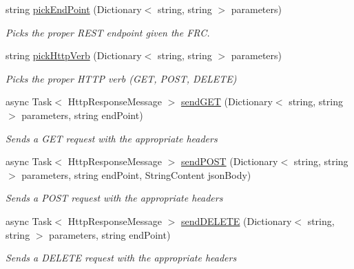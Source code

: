 \begin{DoxyCompactItemize}
string \mbox{\hyperlink{class_form_sim_1_1_rest_handler_a14a4a8f672494cea85c34f23fa508464}{pick\+End\+Point}} (Dictionary$<$ string, string $>$ parameters)
\begin{DoxyCompactList}\small\item\em Picks the proper R\+E\+ST endpoint given the F\+RC. \end{DoxyCompactList}\item 
string \mbox{\hyperlink{class_form_sim_1_1_rest_handler_a205454167e8716d9c1ed0e05d6e88564}{pick\+Http\+Verb}} (Dictionary$<$ string, string $>$ parameters)
\begin{DoxyCompactList}\small\item\em Picks the proper H\+T\+TP verb (G\+ET, P\+O\+ST, D\+E\+L\+E\+TE) \end{DoxyCompactList}\item 
async Task$<$ Http\+Response\+Message $>$ \mbox{\hyperlink{class_form_sim_1_1_rest_handler_adcca9a79f3a98112628190b11fd5c7ca}{send\+G\+ET}} (Dictionary$<$ string, string $>$ parameters, string end\+Point)
\begin{DoxyCompactList}\small\item\em Sends a G\+ET request with the appropriate headers \end{DoxyCompactList}\item 
async Task$<$ Http\+Response\+Message $>$ \mbox{\hyperlink{class_form_sim_1_1_rest_handler_ae69e912f1e70c08e4a9200efcb070bf8}{send\+P\+O\+ST}} (Dictionary$<$ string, string $>$ parameters, string end\+Point, String\+Content json\+Body)
\begin{DoxyCompactList}\small\item\em Sends a P\+O\+ST request with the appropriate headers \end{DoxyCompactList}\item 
async Task$<$ Http\+Response\+Message $>$ \mbox{\hyperlink{class_form_sim_1_1_rest_handler_a6c259e23bd88dc7191327fcca06232d0}{send\+D\+E\+L\+E\+TE}} (Dictionary$<$ string, string $>$ parameters, string end\+Point)
\begin{DoxyCompactList}\small\item\em Sends a D\+E\+L\+E\+TE request with the appropriate headers \end{DoxyCompactList}\end{DoxyCompactItemize}
